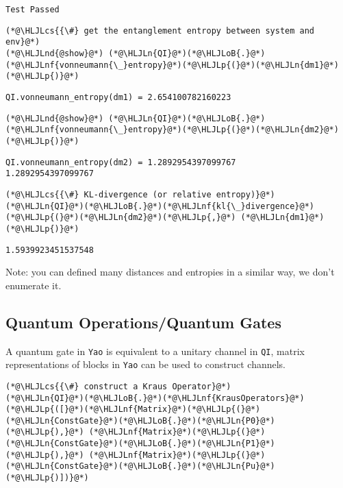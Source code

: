 \documentclass[11pt,a4paper]{article}
\newcommand{\HLJLn}[1]{#1}
\newcommand{\HLJLnd}[1]{\textcolor[RGB]{214,102,97}{#1}}
\newcommand{\HLJLnf}[1]{\textcolor[RGB]{66,102,213}{#1}}
\newcommand{\HLJLoB}[1]{\textcolor[RGB]{102,102,102}{\textbf{#1}}}
\newcommand{\HLJLp}[1]{#1}
\newcommand{\HLJLcs}[1]{\textcolor[RGB]{153,153,119}{\textit{#1}}}
\begin{document}
\begin{lstlisting}
Test Passed
\end{lstlisting}


\begin{lstlisting}
(*@\HLJLcs{{\#} get the entanglement entropy between system and env}@*)
(*@\HLJLnd{@show}@*) (*@\HLJLn{QI}@*)(*@\HLJLoB{.}@*)(*@\HLJLnf{vonneumann{\_}entropy}@*)(*@\HLJLp{(}@*)(*@\HLJLn{dm1}@*)(*@\HLJLp{)}@*)
\end{lstlisting}

\begin{lstlisting}
QI.vonneumann_entropy(dm1) = 2.654100782160223
\end{lstlisting}


\begin{lstlisting}
(*@\HLJLnd{@show}@*) (*@\HLJLn{QI}@*)(*@\HLJLoB{.}@*)(*@\HLJLnf{vonneumann{\_}entropy}@*)(*@\HLJLp{(}@*)(*@\HLJLn{dm2}@*)(*@\HLJLp{)}@*)
\end{lstlisting}

\begin{lstlisting}
QI.vonneumann_entropy(dm2) = 1.2892954397099767
1.2892954397099767
\end{lstlisting}


\begin{lstlisting}
(*@\HLJLcs{{\#} KL-divergence (or relative entropy)}@*)
(*@\HLJLn{QI}@*)(*@\HLJLoB{.}@*)(*@\HLJLnf{kl{\_}divergence}@*)(*@\HLJLp{(}@*)(*@\HLJLn{dm2}@*)(*@\HLJLp{,}@*) (*@\HLJLn{dm1}@*)(*@\HLJLp{)}@*)
\end{lstlisting}

\begin{lstlisting}
1.5939923451537548
\end{lstlisting}


Note: you can defined many distances and entropies in a similar way, we don't enumerate it.

\subsection{Quantum Operations/Quantum Gates}
A quantum gate in \texttt{Yao} is equivalent to a unitary channel in \texttt{QI}, matrix representations of blocks in \texttt{Yao} can be used to construct channels.


\begin{lstlisting}
(*@\HLJLcs{{\#} construct a Kraus Operator}@*)
(*@\HLJLn{QI}@*)(*@\HLJLoB{.}@*)(*@\HLJLnf{KrausOperators}@*)(*@\HLJLp{([}@*)(*@\HLJLnf{Matrix}@*)(*@\HLJLp{(}@*)(*@\HLJLn{ConstGate}@*)(*@\HLJLoB{.}@*)(*@\HLJLn{P0}@*)(*@\HLJLp{),}@*) (*@\HLJLnf{Matrix}@*)(*@\HLJLp{(}@*)(*@\HLJLn{ConstGate}@*)(*@\HLJLoB{.}@*)(*@\HLJLn{P1}@*)(*@\HLJLp{),}@*) (*@\HLJLnf{Matrix}@*)(*@\HLJLp{(}@*)(*@\HLJLn{ConstGate}@*)(*@\HLJLoB{.}@*)(*@\HLJLn{Pu}@*)(*@\HLJLp{)])}@*)
\end{lstlisting}
\end{document}
